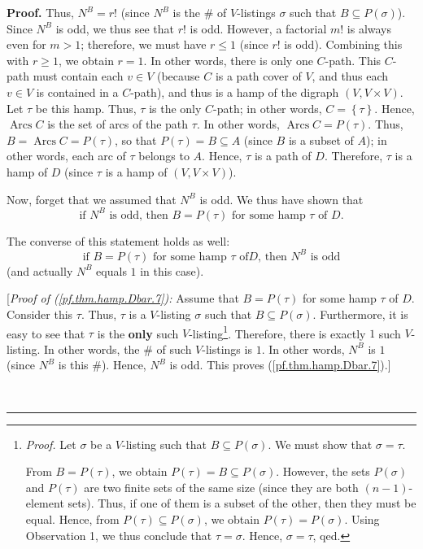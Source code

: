 \documentclass[numbers=enddot,12pt,final,onecolumn,notitlepage]{scrartcl}%
\numberwithin{exer}{subsection}
\theoremstyle{definition}
\newenvironment{proof}[1][Proof]{\noindent\textbf{#1.} }{\ \rule{0.5em}{0.5em}}
\begin{document}
\begin{proof}
Thus, $N^{B}=r!$ (since $N^{B}$ is the $\#$ of $V$-listings $\sigma$ such that
$B\subseteq P\left(  \sigma\right)  $). Since $N^{B}$ is odd, we thus see that
$r!$ is odd. However, a factorial $m!$ is always even for $m>1$; therefore, we
must have $r\leq1$ (since $r!$ is odd). Combining this with $r\geq1$, we
obtain $r=1$. In other words, there is only one $C$-path. This $C$-path must
contain each $v\in V$ (because $C$ is a path cover of $V$, and thus each $v\in
V$ is contained in a $C$-path), and thus is a hamp of the digraph $\left(
V,V\times V\right)  $. Let $\tau$ be this hamp. Thus, $\tau$ is the only
$C$-path; in other words, $C=\left\{  \tau\right\}  $. Hence,
$\operatorname*{Arcs}C$ is the set of arcs of the path $\tau$. In other words,
$\operatorname*{Arcs}C=P\left(  \tau\right)  $. Thus, $B=\operatorname*{Arcs}%
C=P\left(  \tau\right)  $, so that $P\left(  \tau\right)  =B\subseteq A$
(since $B$ is a subset of $A$); in other words, each arc of $\tau$ belongs to
$A$. Hence, $\tau$ is a path of $D$. Therefore, $\tau$ is a hamp of $D$ (since
$\tau$ is a hamp of $\left(  V,V\times V\right)  $).

Now, forget that we assumed that $N^{B}$ is odd. We thus have shown that%
\begin{equation}
\text{if }N^{B}\text{ is odd, then }B=P\left(  \tau\right)  \text{ for some
hamp }\tau\text{ of }D. \label{pf.thm.hamp.Dbar.6}%
\end{equation}


The converse of this statement holds as well:%
\begin{equation}
\text{if }B=P\left(  \tau\right)  \text{ for some hamp }\tau\text{ of
}D\text{, then }N^{B}\text{ is odd} \label{pf.thm.hamp.Dbar.7}%
\end{equation}
(and actually $N^{B}$ equals $1$ in this case).

[\textit{Proof of (\ref{pf.thm.hamp.Dbar.7}):} Assume that $B=P\left(
\tau\right)  $ for some hamp $\tau$ of $D$. Consider this $\tau$. Thus, $\tau$
is a $V$-listing $\sigma$ such that $B\subseteq P\left(  \sigma\right)  $.
Furthermore, it is easy to see that $\tau$ is the \textbf{only} such
$V$-listing\footnote{\textit{Proof.} Let $\sigma$ be a $V$-listing such that
$B\subseteq P\left(  \sigma\right)  $. We must show that $\sigma=\tau$.
\par
From $B=P\left(  \tau\right)  $, we obtain $P\left(  \tau\right)  =B\subseteq
P\left(  \sigma\right)  $. However, the sets $P\left(  \sigma\right)  $ and
$P\left(  \tau\right)  $ are two finite sets of the same size (since they are
both $\left(  n-1\right)  $-element sets). Thus, if one of them is a subset of
the other, then they must be equal. Hence, from $P\left(  \tau\right)
\subseteq P\left(  \sigma\right)  $, we obtain $P\left(  \tau\right)
=P\left(  \sigma\right)  $. Using Observation 1, we thus conclude that
$\tau=\sigma$. Hence, $\sigma=\tau$, qed.}. Therefore, there is exactly $1$
such $V$-listing. In other words, the $\#$ of such $V$-listings is $1$. In
other words, $N^{B}$ is $1$ (since $N^{B}$ is this $\#$). Hence, $N^{B}$ is
odd. This proves (\ref{pf.thm.hamp.Dbar.7}).] \medskip


\end{proof}
\end{document}
